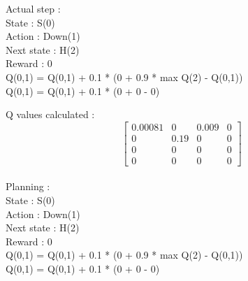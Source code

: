 \documentclass[12pt]{article}
\newenvironment{problem}[2][\large Problem]{\begin{trivlist}
\item[\hskip \labelsep {\bfseries #1}\hskip \labelsep {\bfseries #2.}]}{\end{trivlist}}
\begin{document}
\begin{problem} {4}
\begin{itemize}
\hspace*{20pt} Actual step : \\

State : S(0) \\ Action : Down(1) \\ Next state : H(2) \\ Reward : 0\\

\hspace*{20pt} Q(0,1) = Q(0,1) + 0.1 * (0 + 0.9 * max Q(2) - Q(0,1))\\
\hspace*{20pt} Q(0,1) = Q(0,1) + 0.1 * (0 + 0 - 0)

Q values calculated : 
\[\begin{bmatrix}
0.00081 & 0 & 0.009 & 0\\
0 & 0.19 & 0 & 0\\
0 & 0 & 0 & 0\\
0 & 0 & 0 & 0
\end{bmatrix}\]\\

\hspace*{20pt} Planning : \\


State : S(0) \\ Action : Down(1) \\ Next state : H(2) \\ Reward : 0\\
\hspace*{20pt} Q(0,1) = Q(0,1) + 0.1 * (0 + 0.9 * max Q(2) - Q(0,1))\\
\hspace*{20pt} Q(0,1) = Q(0,1) + 0.1 * (0 + 0 - 0)


\end{itemize}
\end{problem}
\end{document}
